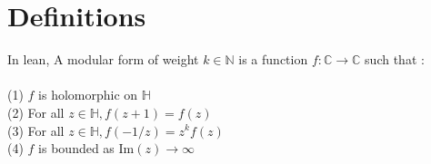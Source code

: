 




\section{Definitions}

\begin{definition} 
  \label{def:ModularForm}
  \leanok
  In lean, A modular form of weight $k \in \mathbb{N}$ is a function $f : \mathbb{C} → \mathbb{C}$ such that : \\ \\
  (1) $f$ is holomorphic on $\mathbb{H}$ \\
  (2) For all $z \in \mathbb{H}, f(z + 1) = f(z)$ \\
  (3) For all $z \in \mathbb{H}, f(-1/z) = z^{k} f(z)$ \\
  (4) $f$ is bounded as Im$(z) \to \infty$ \\
\end{definition}

